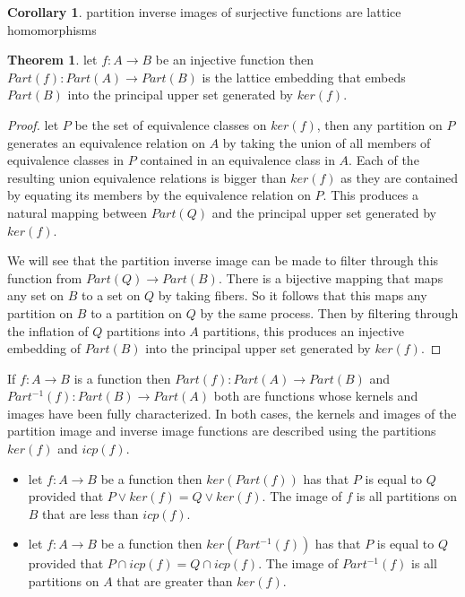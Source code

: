 \documentclass[a4paper,11pt, notitlepage]{report}
\theoremstyle{definition}
\newtheorem{theorem}{Theorem}[section]
\newtheorem{corollary}{Corollary}[section]
\begin{document}
\begin{corollary}
partition inverse images of surjective functions are lattice homomorphisms
\end{corollary}

\begin{theorem}
let $f : A \to B$ be an injective function then $Part(f): Part(A) \to Part(B)$ is the lattice embedding that embeds $Part(B)$ into the principal upper set generated by $ker(f)$.
\end{theorem}

\begin{proof}
let $P$ be the set of equivalence classes on $ker(f)$, then any partition on $P$ generates an equivalence relation on $A$ by taking the union of all members of equivalence classes in $P$ contained in an equivalence class in $A$. Each of the resulting union equivalence relations is bigger than $ker(f)$ as they are contained by equating its members by the equivalence relation on $P$. This produces a natural mapping between $Part(Q)$ and the principal upper set generated by $ker(f)$.

We will see that the partition inverse image can be made to filter through this function from $Part(Q) \to Part(B)$. There is a bijective mapping that maps any set on $B$ to a set on $Q$ by taking fibers. So it follows that this maps any partition on $B$ to a partition on $Q$ by the same process. Then by filtering through the inflation of $Q$ partitions into $A$ partitions, this produces an injective embedding of $Part(B)$ into the principal upper set generated by $ker(f)$.
\end{proof}

If $f: A \to B$ is a function then $Part(f): Part(A) \to Part(B)$ and $Part^{-1}(f) : Part(B) \to Part(A)$ both are functions whose kernels and images have been fully characterized. In both cases, the kernels and images of the partition image and inverse image functions are described using the partitions $ker(f)$ and $icp(f)$.

\begin{itemize}
 \item let $f: A \to B$ be a function then $ker(Part(f))$ has that $P$ is equal to $Q$ provided that $P \vee ker(f) = Q \vee ker(f)$. The image of $f$ is all partitions on $B$ that are less than $icp(f)$.
 \item let $f: A \to B$ be a function then $ker(Part^{-1}(f))$ has that $P$ is equal to $Q$ provided that $P \cap icp(f) = Q \cap icp(f)$. The image of $Part^{-1}(f)$ is all partitions on $A$ that are greater than $ker(f)$.
\end{itemize}
\end{document}

